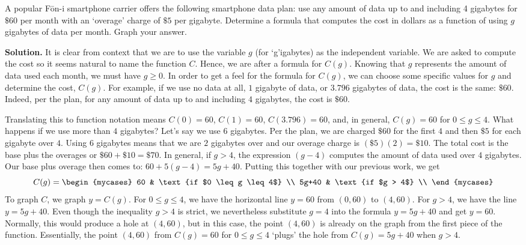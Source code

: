\begin{ex}  \label{dataplanex} A popular F\={o}n-i smartphone carrier offers the following smartphone data plan: use any amount of data up to and including 4 gigabytes for $\$ 60$ per month with an `overage' charge of $ \$5$ per gigabyte.  Determine a formula that computes the cost in dollars as a function of using $g$ gigabytes of data per month. Graph your answer.

\medskip

{\bf Solution.}  It is clear from context that we are to use the variable $g$ (for `g'igabytes) as the independent variable.  We are asked to compute the cost so it seems natural to name the function $C$.  Hence, we are after a formula for $C(g)$.  Knowing that $g$ represents the amount of data used each month, we must have $g \geq 0$.  In order to get a feel for the formula for $C(g)$, we can choose some specific values for $g$ and determine the cost, $C(g)$.  For example, if we use no data at all, $1$ gigabyte of data,  or $3.796$ gigabytes of data, the cost is the same:  $\$60$.  Indeed, per the plan, for any amount of data up to and including $4$ gigabytes, the cost is $\$60$.  

\medskip

Translating this to function notation means $C(0) = 60$, $C(1) = 60$, $C(3.796) = 60$, and, in general, $C(g) = 60$ for  $0 \leq g \leq 4$.  What happens if we use more than $4$ gigabytes?  Let's say we use $6$ gigabytes.  Per the plan, we are charged $\$60$ for the first $4$ and then $\$5$ for each gigabyte over $4$.  Using $6$ gigabytes means that we are $2$ gigabytes over and our overage charge is $ (\$ 5)(2) = \$ 10$.  The total cost is the base plus the overages or $\$60 + \$10 = \$70$.  In general, if $g>4$, the expression $(g-4)$ computes the amount of data used over $4$ gigabytes.  Our base plus overage then comes to: $60 + 5(g-4) = 5g+40$.  Putting this together with our previous work, we get \[ C(g)  = \begin{mycases} 
      60 &  \text{if $0 \leq g \leq 4$} \\
      5g+40   & \text{if $g > 4$} \\
   \end{mycases}
\] To graph $C$, we graph $y = C(g)$.  For $0 \leq g \leq 4$, we have the horizontal line $y = 60$ from $(0,60)$ to $(4,60)$.  For $g>4$, we have the line $y = 5g+ 40$.  Even though the inequality $g > 4$ is strict, we nevertheless substitute $g = 4$ into the formula $y = 5g + 40$ and get $y = 60$.  Normally, this would produce a hole at $(4, 60)$, but in this case, the point $(4, 60)$ is already on the graph from the first piece of the function.  Essentially, the point $(4,60)$ from $C(g) = 60$ for $0 \leq g \leq 4$ `plugs' the hole from $C(g) = 5g + 40$ when $g> 4$.   


\end{ex}
